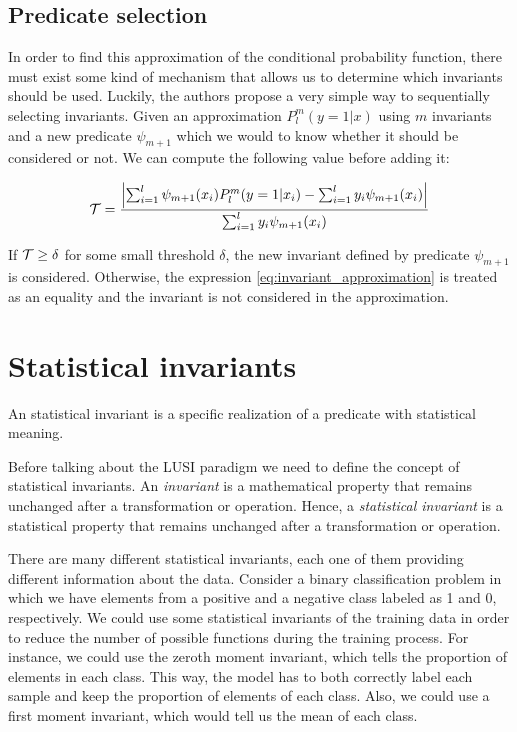 \subsection{Predicate selection}

In order to find this approximation of the conditional probability function, there must exist
some kind of mechanism that allows us to determine which invariants should be used. Luckily,
the authors propose a very simple way to sequentially selecting invariants. Given an approximation
$P_l^m(y=1|x)$ using $m$ invariants and a new predicate $\psi_{m+1}$ which we would to know whether
it should be considered or not. We can compute the following value before adding it:

\begin{equation}
    \label{eq:predicate_selection}
    \mathcal{T} = \frac{\left| \sum_{i=1}^l \psi_{m+1}(x_i) P^m_l(y = 1 | x_i) - \sum_{i=1}^l y_i \psi_{m+1}(x_i) \right|}{\sum_{i=1}^l y_i \psi_{m+1}(x_i)}
\end{equation}

If $\mathcal{T} \geq \delta$ for some small threshold $\delta$, the new invariant defined by predicate $\psi_{m+1}$
is considered. Otherwise, the expression \eqref{eq:invariant_approximation} is treated as an equality
and the invariant is not considered in the approximation.


\section{Statistical invariants}

An statistical invariant is a specific realization of a predicate with statistical meaning.



Before talking about the LUSI paradigm we need to define the concept of statistical invariants.
An \emph{invariant} is a mathematical property that remains unchanged after a transformation
or operation. Hence, a \emph{statistical invariant} is a statistical property that remains
unchanged after a transformation or operation.

There are many different statistical invariants, each one of them providing different information
about the data. Consider a binary classification problem in which we have elements from a
positive and a negative class labeled as 1 and 0, respectively. We could use some statistical
invariants of the training data in order to reduce the number of possible functions during
the training process. For instance, we could use the zeroth moment invariant, which tells the
proportion of elements in each class. This way, the model has to both correctly label each sample
and keep the proportion of elements of each class. Also, we could use a first moment invariant,
which would tell us the mean of each class.


